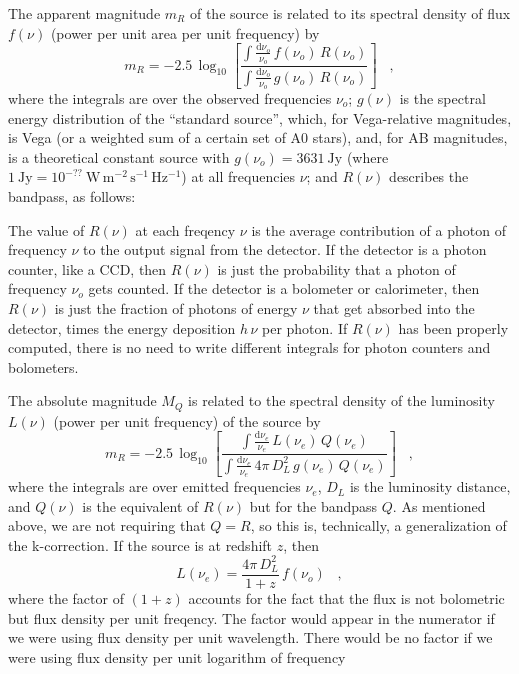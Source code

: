 \documentclass[12pt,preprint]{aastex}
\begin{document}
The apparent magnitude $m_R$ of the source is related to its spectral
density of flux $f(\nu)$ (power per unit area per unit frequency) by
\begin{equation}
m_R = -2.5\,\log_{10}\left[
  \frac{\int\frac{\mathrm{d}\nu_o}{\nu_o}\,f(\nu_o)\,R(\nu_o)}
       {\int\frac{\mathrm{d}\nu_o}{\nu_o}\,g(\nu_o)\,R(\nu_o)}
\right] \;\;\;,
\end{equation}
where the integrals are over the observed frequencies $\nu_o$;
$g(\nu)$ is the spectral energy distribution of the ``standard
source'', which, for Vega-relative magnitudes, is Vega (or a weighted
sum of a certain set of A0 stars), and, for AB magnitudes, is a
theoretical constant source with $g(\nu_o)=3631~\mathrm{Jy}$ (where
$1~\mathrm{Jy}= 10^{-??}~\mathrm{W\,m^{-2}\,s^{-1}\,Hz^{-1}}$) at all
frequencies $\nu$; and $R(\nu)$ describes the bandpass, as follows:

The value of $R(\nu)$ at each freqency $\nu$ is the average
contribution of a photon of frequency $\nu$ to the output signal from
the detector.  If the detector is a photon counter, like a CCD, then
$R(\nu)$ is just the probability that a photon of frequency $\nu_o$
gets counted.  If the detector is a bolometer or calorimeter, then
$R(\nu)$ is just the fraction of photons of energy $\nu$ that get
absorbed into the detector, times the energy deposition $h\,\nu$ per
photon.  If $R(\nu)$ has been properly computed, there is no need to
write different integrals for photon counters and bolometers.

The absolute magnitude $M_Q$ is related to the spectral density of the
luminosity $L(\nu)$ (power per unit frequency) of the source by
\begin{equation}
m_R = -2.5\,\log_{10}\left[
  \frac{\int\frac{\mathrm{d}\nu_e}{\nu_e}\,L(\nu_e)\,             Q(\nu_e)}
       {\int\frac{\mathrm{d}\nu_e}{\nu_e}\,4\pi\,D_L^2\,g(\nu_e)\,Q(\nu_e)}
\right] \;\;\;,
\end{equation}
where the integrals are over emitted frequencies $\nu_e$, $D_L$ is the
luminosity distance, and $Q(\nu)$ is the equivalent of $R(\nu)$ but
for the bandpass $Q$.  As mentioned above, we are not requiring that
$Q=R$, so this is, technically, a generalization of the k-correction.
If the source is at redshift $z$, then
\begin{equation}
L(\nu_e) = \frac{4\pi\,D_L^2}{1+z}\,f(\nu_o) \;\;\;,
\end{equation}
where the factor of $(1+z)$ accounts for the fact that the flux is not
bolometric but flux density per unit freqency.  The factor would
appear in the numerator if we were using flux density per unit
wavelength.  There would be no factor if we were using flux density
per unit logarithm of frequency
\end{document}
